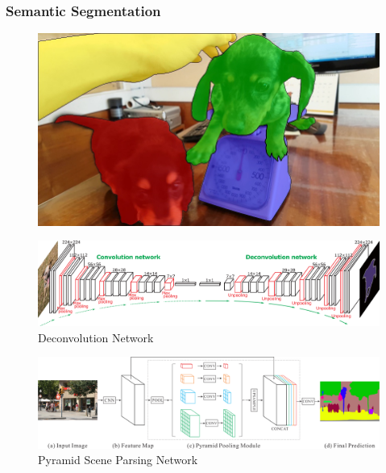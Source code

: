 \documentclass[presentation]{beamer}
\begin{document}
\begin{frame}[allowframebreaks]
    \frametitle{Semantic Segmentation}

    \begin{figure}
        \centering
        \includegraphics[width=0.95\linewidth]{3.jpg}
        \caption{}
    \end{figure}

    \begin{figure}
        \centering
        \includegraphics[width=0.95\linewidth]{3_1.png}
        \caption{Deconvolution Network}
    \end{figure}

    \begin{figure}
        \centering
        \includegraphics[width=0.95\linewidth]{3_2.png}
        \caption{Pyramid Scene Parsing Network}
    \end{figure}

\end{frame}
\end{document}
